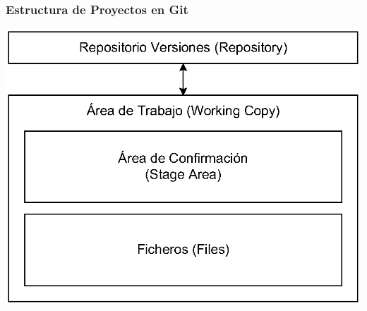 \documentclass[hanbdout,a4paper,slidestop,dvips,xcolor=pst,blue]{beamer}
\begin{document}
\begin{frame}[c]
	\frametitle{Estructura de Proyectos en Git}
	 \begin{center}
		\includegraphics[width=0.75\linewidth,keepaspectratio=true]{images/git/estructuraDirectorios.eps}
	 \end{center}
\end{frame}
\end{document}
